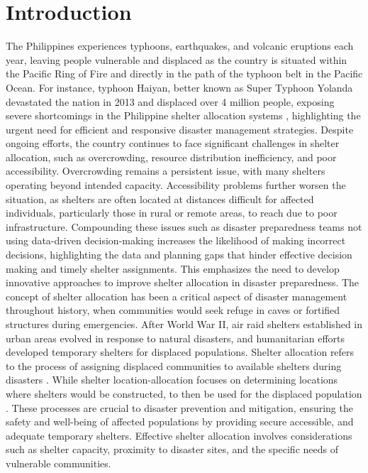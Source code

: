 \documentclass[12pt,a4paper,]{article}
\begin{document}
\section{Introduction}
	The Philippines experiences typhoons, earthquakes, and volcanic eruptions each year, leaving people vulnerable and displaced as the country is situated within the Pacific Ring of Fire and directly in the path of the typhoon belt in the Pacific Ocean. For instance, typhoon Haiyan, better known as Super Typhoon Yolanda devastated the nation in 2013 and displaced over 4 million people, exposing severe shortcomings in the Philippine shelter allocation systems \parencite{Iuchi2019}, highlighting the urgent need for efficient and responsive disaster management strategies. Despite ongoing efforts, the country continues to face significant challenges in shelter allocation, such as overcrowding, resource distribution inefficiency, and poor accessibility.
	Overcrowding remains a persistent issue, with many shelters operating beyond intended capacity. Accessibility problems further worsen the situation, as shelters are often located at distances difficult for affected individuals, particularly those in rural or remote areas, to reach due to poor infrastructure. Compounding these issues such as disaster preparedness teams not using data-driven decision-making increases the likelihood of making incorrect decisions, highlighting the data and planning gaps that hinder effective decision making and timely shelter assignments. This emphasizes the need to develop innovative approaches to improve shelter allocation in disaster preparedness.
	The concept of shelter allocation has been a critical aspect of disaster management throughout history, when communities would seek refuge in caves or fortified structures during emergencies. After World War II, air raid shelters established in urban areas evolved in response to natural disasters, and humanitarian efforts developed temporary shelters for displaced populations.
	Shelter allocation refers to the process of assigning displaced communities to available shelters during disasters \parencite{Yin2023}. While shelter location-allocation focuses on determining locations where shelters would be constructed, to then be used for the displaced population \parencite{Xiujuan2019}. These processes are crucial to disaster prevention and mitigation, ensuring the safety and well-being of affected populations by providing secure accessible, and adequate temporary shelters. Effective shelter allocation involves considerations such as shelter capacity, proximity to disaster sites, and the specific needs of vulnerable communities.
\end{document}
